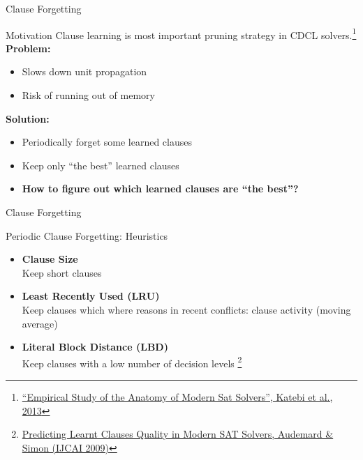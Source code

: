\documentclass[t]{sdqbeamer}
\begin{document}
\begin{frame}{Clause Forgetting}
\begin{block}{Motivation}
Clause learning is most important pruning strategy in CDCL solvers.\footnote{\href{https://doi.org/10.1007/978-3-642-21581-0_27}{``Empirical Study of the Anatomy of Modern Sat Solvers'', Katebi et al., 2013}}\\[1ex]
\textbf{Problem:}
\begin{itemize}
    \item Slows down unit propagation
    \item Risk of running out of memory
\end{itemize}
\textbf{Solution:}
\begin{itemize}
    \item Periodically forget some learned clauses
    \item Keep only ``the best'' learned clauses
    \item<2> \textbf{How to figure out which learned clauses are ``the best''?}
\end{itemize}
\end{block}
\end{frame}

\begin{frame}{Clause Forgetting}
\begin{block}{Periodic Clause Forgetting: Heuristics}
\begin{itemize}\setlength{\itemsep}{1em}
    \item \textbf{Clause Size}\\[1ex]
    Keep short clauses
    \item \textbf{Least Recently Used (LRU)}\\[1ex]
    Keep clauses which where reasons in recent conflicts: clause activity (moving average)
    \item \textbf{Literal Block Distance (LBD)}\\[1ex]
    Keep clauses with a low number of decision levels%
    \footnote{\href{https://www.ijcai.org/Proceedings/09/Papers/074.pdf}{Predicting Learnt Clauses Quality in Modern SAT Solvers, Audemard \& Simon (IJCAI 2009)}}
\end{itemize}
\end{block}
\end{frame}
    
\end{document}

